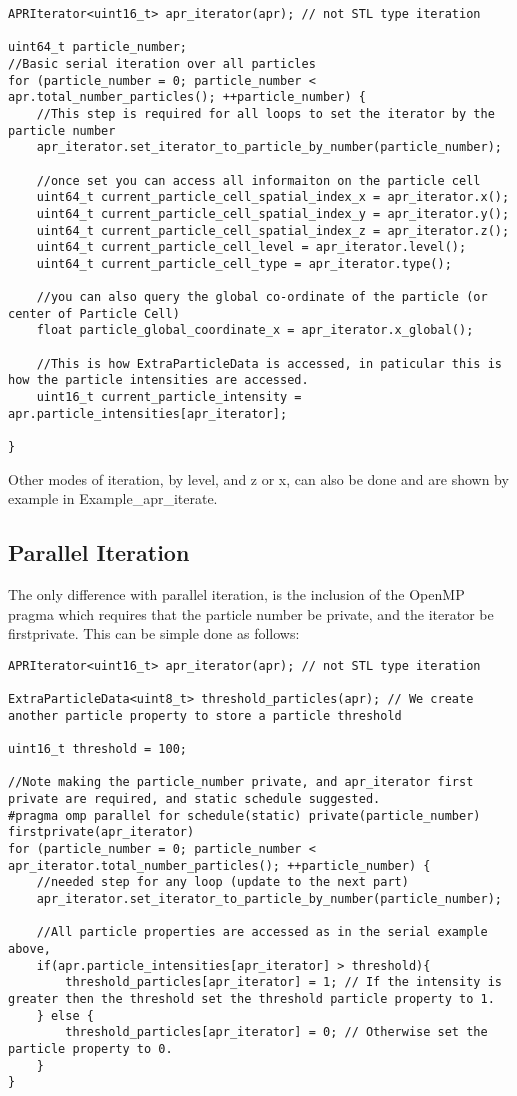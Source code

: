 \documentclass[12pt]{article}
\begin{document}
\begin{lstlisting}
APRIterator<uint16_t> apr_iterator(apr); // not STL type iteration

uint64_t particle_number;
//Basic serial iteration over all particles
for (particle_number = 0; particle_number < apr.total_number_particles(); ++particle_number) {
	//This step is required for all loops to set the iterator by the particle number
	apr_iterator.set_iterator_to_particle_by_number(particle_number);

	//once set you can access all informaiton on the particle cell
	uint64_t current_particle_cell_spatial_index_x = apr_iterator.x();
	uint64_t current_particle_cell_spatial_index_y = apr_iterator.y();
	uint64_t current_particle_cell_spatial_index_z = apr_iterator.z();
	uint64_t current_particle_cell_level = apr_iterator.level();
	uint64_t current_particle_cell_type = apr_iterator.type();
	
	//you can also query the global co-ordinate of the particle (or center of Particle Cell)
	float particle_global_coordinate_x = apr_iterator.x_global();
	
	//This is how ExtraParticleData is accessed, in paticular this is how the particle intensities are accessed.
	uint16_t current_particle_intensity = apr.particle_intensities[apr_iterator];

}
\end{lstlisting}
Other modes of iteration, by level, and z or x, can also be done and are shown by example in Example\_apr\_iterate.
\subsection{Parallel Iteration}
The only difference with parallel iteration, is the inclusion of the OpenMP pragma which requires that the particle number be private, and the iterator be firstprivate. This can be simple done as follows:
\begin{lstlisting}
APRIterator<uint16_t> apr_iterator(apr); // not STL type iteration

ExtraParticleData<uint8_t> threshold_particles(apr); // We create another particle property to store a particle threshold

uint16_t threshold = 100;

//Note making the particle_number private, and apr_iterator first private are required, and static schedule suggested.
#pragma omp parallel for schedule(static) private(particle_number) firstprivate(apr_iterator)
for (particle_number = 0; particle_number < apr_iterator.total_number_particles(); ++particle_number) {
	//needed step for any loop (update to the next part)
	apr_iterator.set_iterator_to_particle_by_number(particle_number);

	//All particle properties are accessed as in the serial example above,
	if(apr.particle_intensities[apr_iterator] > threshold){
		threshold_particles[apr_iterator] = 1; // If the intensity is greater then the threshold set the threshold particle property to 1.
	} else {
		threshold_particles[apr_iterator] = 0; // Otherwise set the particle property to 0.
	}
}
\end{lstlisting}
\end{document}
